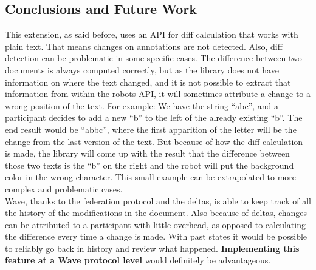 \subsection{Conclusions and Future Work}
This extension, as said before, uses an API for diff calculation that works with plain text. That means changes on annotations are not detected. Also, diff detection can be problematic in some specific cases. The difference between two documents is always computed correctly, but as the library does not have information on where the text changed, and it is not possible to extract that information from within the robots API, it will sometimes attribute a change to a wrong position of the text. For example: We have the string ``abc'', and a participant decides to add a new ``b'' to the left of the already existing ``b''. The end result would be ``abbc'', where the first apparition of the letter will be the change from the last version of the text. But because of how the diff calculation is made, the library will come up with the result that the difference between those two texts is the ``b'' on the right and the robot will put the background color in the wrong character. This small example can be extrapolated to more complex and problematic cases.\\[.2cm]
Wave, thanks to the federation protocol and the deltas, is able to keep track of all the history of the modifications in the document. Also because of deltas, changes can be attributed to a participant with little overhead, as opposed to calculating the difference every time a change is made. With past states it would be possible to reliably go back in history and review what happened. \textbf{Implementing this feature at a Wave protocol level} would definitely be advantageous.
